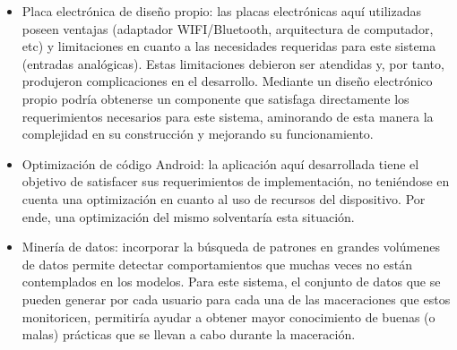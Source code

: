 \begin{itemize}
    \item Placa electrónica de diseño propio: las placas electrónicas aquí utilizadas poseen ventajas (adaptador WIFI/Bluetooth, arquitectura de computador, etc) y limitaciones  en cuanto a las necesidades requeridas para este sistema (entradas analógicas). Estas limitaciones debieron ser atendidas y, por tanto, produjeron complicaciones en el desarrollo. Mediante un diseño electrónico propio podría obtenerse un componente que satisfaga directamente los requerimientos necesarios para este sistema, aminorando de esta manera la complejidad en su construcción y mejorando su funcionamiento.
    
    \item Optimización de código Android: la aplicación aquí desarrollada tiene el objetivo de satisfacer sus requerimientos de implementación, no teniéndose en cuenta una optimización en cuanto al uso de recursos del dispositivo. Por ende, una optimización del mismo solventaría esta situación.
    
    \item Minería de datos: incorporar la búsqueda de patrones en grandes volúmenes de datos permite detectar comportamientos que muchas veces no están contemplados en los modelos. Para este sistema, el conjunto de datos que se pueden generar por cada usuario para cada una de las maceraciones que estos monitoricen, permitiría ayudar a obtener mayor conocimiento de buenas (o malas) prácticas que se llevan a cabo durante la maceración. 
    
    
\end{itemize}

\clearpage